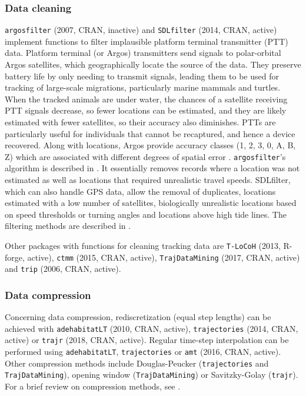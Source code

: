\documentclass[a4paper,12pt]{article}
\newcommand{\Rpkg}[1]{\texttt{#1}}
\begin{document}
\subsubsection*{Data cleaning}

\Rpkg{argosfilter} (2007, CRAN, inactive) and \Rpkg{SDLfilter} (2014, CRAN, active) implement functions to filter implausible platform terminal transmitter (PTT) data. Platform terminal (or Argos) transmitters send signals to polar-orbital Argos satellites, which geographically locate the source of the data. They preserve battery life by only needing to transmit signals, leading them to be used for tracking of large-scale migrations, particularly marine mammals and turtles. When the tracked animals are under water, the chances of a satellite receiving PTT signals decrease, so fewer locations can be estimated, and they are likely estimated with fewer satellites, so their accuracy also diminishes. PTTs are particularly useful for individuals that cannot be recaptured, and hence a device recovered. Along with locations, Argos provide accuracy classes (1, 2, 3, 0, A, B, Z) which are associated with different degrees of spatial error \citep{Costa2010}. \Rpkg{argosfilter}'s algorithm is described in \cite{Freitas2007}. It essentially removes records where a location was not estimated as well as locations that required unrealistic travel speeds. SDLfilter, which can also handle GPS data, allow the removal of duplicates, locations estimated with a low number of satellites, biologically unrealistic locations based on speed thresholds or turning angles and locations above high tide lines. The filtering methods are described in \cite{Shimada2012,Shimada2016}.

Other packages with functions for cleaning tracking data are \Rpkg{T-LoCoH} (2013, R-forge, active), \Rpkg{ctmm} (2015, CRAN, active), \Rpkg{TrajDataMining} (2017, CRAN, active) and \Rpkg{trip} (2006, CRAN, active). 

\subsubsection*{Data compression}

Concerning data compression, rediscretization (equal step lengths) can be achieved with \Rpkg{adehabitatLT} (2010, CRAN, active), \Rpkg{trajectories} (2014, CRAN, active) or \Rpkg{trajr} (2018, CRAN, active). Regular time-step interpolation can be performed using \Rpkg{adehabitatLT}, \Rpkg{trajectories} or \Rpkg{amt} (2016, CRAN, active). Other compression methods include Douglas-Peucker (\Rpkg{trajectories} and \Rpkg{TrajDataMining}), opening window (\Rpkg{TrajDataMining}) or Savitzky-Golay (\Rpkg{trajr}). For a brief review on compression methods, see \cite{Meratnia2004}.
\end{document}
